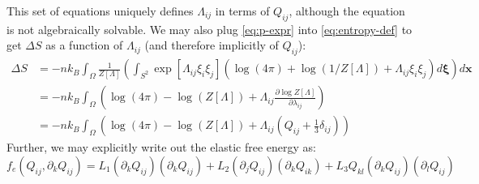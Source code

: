 \documentclass[reqno]{article}
\begin{document}
	This set of equations uniquely defines $\Lambda_{ij}$ in terms of $Q_{ij}$, although the equation is not algebraically solvable.
	We may also plug \eqref{eq:p-expr} into \eqref{eq:entropy-def} to get $\Delta S$ as a function of $\Lambda_{ij}$ (and therefore implicitly of $Q_{ij}$):
	\begin{equation}
	\begin{split}
		\Delta S
		&= -n k_B \int_{\Omega} \frac{1}{Z[\Lambda]} \left(
		\int_{S^2} \exp[\Lambda_{ij} \xi_i \xi_j]
		\left(\log(4\pi) + \log(1 / Z[\Lambda]) + \Lambda_{ij} \xi_i \xi_j\right) d \mathbf{\xi}
		\right) d\mathbf{x} \\
		&= -n k_B \int_{\Omega} \left(
		\log(4 \pi) - \log(Z[\Lambda])
		+ \Lambda_{ij} \frac{\partial \log Z[\Lambda]}{\partial \lambda_{ij}}
		\right) \\
		&= -n k_B \int_{\Omega} \left(
		\log(4 \pi) - \log(Z[\Lambda])
		+ \Lambda_{ij} \left( Q_{ij} + \tfrac13	 \delta_{ij} \right)
		\right)
	\end{split}
	\end{equation}
	Further, we may explicitly write out the elastic free energy as:
	\begin{equation}
		f_e (Q_{ij}, \partial_k Q_{ij})
		= L_1 \left(\partial_k Q_{ij}\right) \left(\partial_k Q_{ij}\right)
		+ L_2 \left(\partial_j Q_{ij}\right) \left(\partial_k Q_{ik}\right)
		+ L_3 Q_{kl} \left(\partial_k Q_{ij}\right) \left(\partial_l Q_{ij}\right)
	\end{equation}
	
\end{document}

